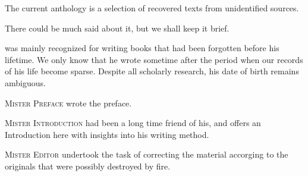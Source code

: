 
{\centering\par
\Large\scshape\chapTitleFont\thetitle
\par}
\vspace*{2\baselineskip}

{%
\setlength{\parskip}{1.5em}
\setlength{\parindent}{0pt}

The current anthology is a selection of recovered texts from unidentified sources.

There could be much said about it, but we shall keep it brief.
\bigskip

\clearpage
\thispagestyle{empty}

{\scshape \theauthor} was mainly recognized for writing books that had been forgotten before his lifetime. We only know that he wrote \textit{\thetitle} sometime after the period when our records of his life become sparse. Despite all scholarly research, his date of birth remains ambiguous.
\bigskip

{\scshape Mister Preface} wrote the preface.
\bigskip

{\scshape Mister Introduction} had been a long time friend of his, and offers an Introduction here with insights into his writing method.
\bigskip

{\scshape Mister Editor} undertook the task of correcting the material accorging to the originals that were possibly destroyed by fire.
\bigskip

}

